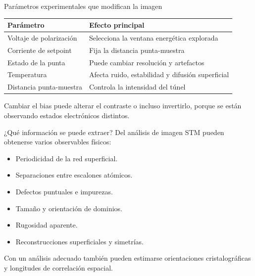 \begin{frame}{Parámetros experimentales que modifican la imagen}
    \begin{table}
        \centering
        \begin{tabular}{@{}ll@{}}
            \toprule
            Parámetro & Efecto principal \\ \midrule
            Voltaje de polarización & Selecciona la ventana energética explorada \\
            Corriente de setpoint & Fija la distancia punta-muestra \\
            Estado de la punta & Puede cambiar resolución y artefactos \\
            Temperatura & Afecta ruido, estabilidad y difusión superficial \\
            Distancia punta-muestra & Controla la intensidad del túnel \\ \bottomrule
        \end{tabular}
    \end{table}

    \vspace{1mm}
    Cambiar el bias puede alterar el contraste o incluso invertirlo, porque se están observando estados electrónicos distintos.
\end{frame}

\begin{frame}{¿Qué información se puede extraer?}
    Del análisis de imagen STM pueden obtenerse varios observables físicos:
    \begin{itemize}
        \item Periodicidad de la red superficial.
        \item Separaciones entre escalones atómicos.
        \item Defectos puntuales e impurezas.
        \item Tamaño y orientación de dominios.
        \item Rugosidad aparente.
        \item Reconstrucciones superficiales y simetrías.
    \end{itemize}

    \vspace{2mm}
    Con un análisis adecuado también pueden estimarse orientaciones cristalográficas y longitudes de correlación espacial.
\end{frame}

